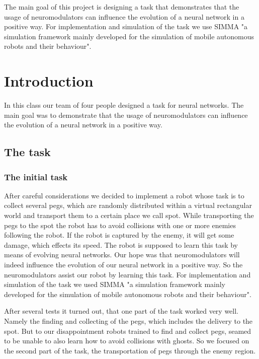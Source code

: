 \documentclass[12pt,fleqn,a4paper]{article}
\begin{document}
\clearpage
\pagestyle{headings}
\setcounter{page}{1}
\setcounter{page}{1}

\tableofcontents
\newpage

\abstract
{The main goal of this project is designing a task that demonstrates that the usage of neuromodulators can influence the evolution of a neural network in a positive way. For implementation and simulation of the task we use SIMMA "a simulation framework mainly developed for the simulation of mobile autonomous robots and their behaviour".}

\section{Introduction}
In this class our team of four people designed a task for neural networks.  The main goal was to demonstrate that the usage of neuromodulators can influence the evolution of a neural network in a positive way.

\subsection{The task}

\subsubsection{The initial task}
After careful considerations we decided to implement a robot whose task is to collect several pegs, which are randomly distributed within a virtual rectangular world and transport them to a certain place we call spot. While transporting the pegs to the spot the robot has to avoid collisions with one or more enemies following the robot. If the robot is captured by the enemy, it will get some damage, which effects its speed. The robot is supposed to learn this task by means of evolving neural networks. Our hope was that neuromodulators will indeed influence the evolution of our neural network in a positive way. So the neuromodulators assist our robot by learning this task. For implementation and simulation of the task we used SIMMA "a simulation framework mainly developed for the simulation of mobile autonomous robots and their behaviour".

After several tests it turned out, that one part of the task worked very well. Namely the finding and collecting of the pegs, which includes the delivery to the spot. But to our disappointment robots trained to find and collect pegs, seamed to be unable to also learn how to avoid collisions with ghosts. So we focused on the second part of the task, the transportation of pegs through the enemy region.
\end{document}
